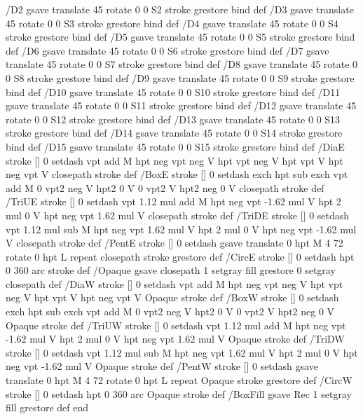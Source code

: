 {{/D2 { gsave translate 45 rotate 0 0 S2 stroke grestore } bind def
/D3 { gsave translate 45 rotate 0 0 S3 stroke grestore } bind def
/D4 { gsave translate 45 rotate 0 0 S4 stroke grestore } bind def
/D5 { gsave translate 45 rotate 0 0 S5 stroke grestore } bind def
/D6 { gsave translate 45 rotate 0 0 S6 stroke grestore } bind def
/D7 { gsave translate 45 rotate 0 0 S7 stroke grestore } bind def
/D8 { gsave translate 45 rotate 0 0 S8 stroke grestore } bind def
/D9 { gsave translate 45 rotate 0 0 S9 stroke grestore } bind def
/D10 { gsave translate 45 rotate 0 0 S10 stroke grestore } bind def
/D11 { gsave translate 45 rotate 0 0 S11 stroke grestore } bind def
/D12 { gsave translate 45 rotate 0 0 S12 stroke grestore } bind def
/D13 { gsave translate 45 rotate 0 0 S13 stroke grestore } bind def
/D14 { gsave translate 45 rotate 0 0 S14 stroke grestore } bind def
/D15 { gsave translate 45 rotate 0 0 S15 stroke grestore } bind def
/DiaE { stroke [] 0 setdash vpt add M
  hpt neg vpt neg V hpt vpt neg V
  hpt vpt V hpt neg vpt V closepath stroke } def
/BoxE { stroke [] 0 setdash exch hpt sub exch vpt add M
  0 vpt2 neg V hpt2 0 V 0 vpt2 V
  hpt2 neg 0 V closepath stroke } def
/TriUE { stroke [] 0 setdash vpt 1.12 mul add M
  hpt neg vpt -1.62 mul V
  hpt 2 mul 0 V
  hpt neg vpt 1.62 mul V closepath stroke } def
/TriDE { stroke [] 0 setdash vpt 1.12 mul sub M
  hpt neg vpt 1.62 mul V
  hpt 2 mul 0 V
  hpt neg vpt -1.62 mul V closepath stroke } def
/PentE { stroke [] 0 setdash gsave
  translate 0 hpt M 4 {72 rotate 0 hpt L} repeat
  closepath stroke grestore } def
/CircE { stroke [] 0 setdash 
  hpt 0 360 arc stroke } def
/Opaque { gsave closepath 1 setgray fill grestore 0 setgray closepath } def
/DiaW { stroke [] 0 setdash vpt add M
  hpt neg vpt neg V hpt vpt neg V
  hpt vpt V hpt neg vpt V Opaque stroke } def
/BoxW { stroke [] 0 setdash exch hpt sub exch vpt add M
  0 vpt2 neg V hpt2 0 V 0 vpt2 V
  hpt2 neg 0 V Opaque stroke } def
/TriUW { stroke [] 0 setdash vpt 1.12 mul add M
  hpt neg vpt -1.62 mul V
  hpt 2 mul 0 V
  hpt neg vpt 1.62 mul V Opaque stroke } def
/TriDW { stroke [] 0 setdash vpt 1.12 mul sub M
  hpt neg vpt 1.62 mul V
  hpt 2 mul 0 V
  hpt neg vpt -1.62 mul V Opaque stroke } def
/PentW { stroke [] 0 setdash gsave
  translate 0 hpt M 4 {72 rotate 0 hpt L} repeat
  Opaque stroke grestore } def
/CircW { stroke [] 0 setdash 
  hpt 0 360 arc Opaque stroke } def
/BoxFill { gsave Rec 1 setgray fill grestore } def
end
}}%
